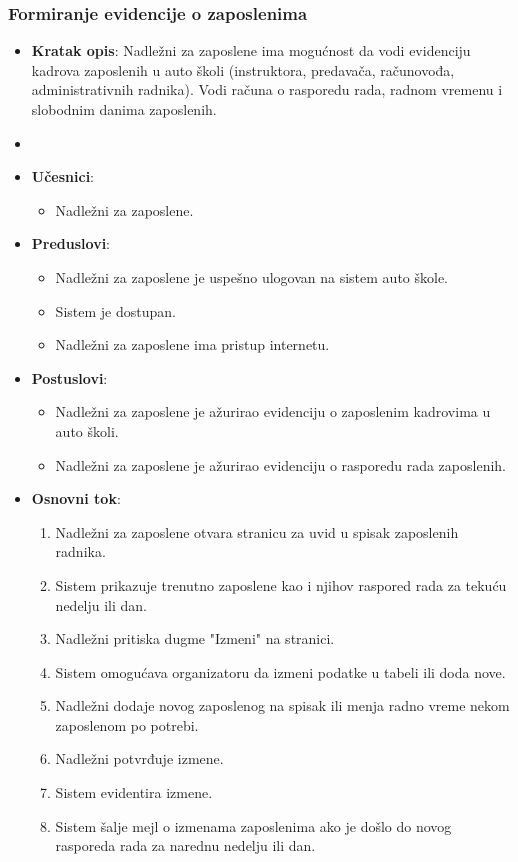 \subsubsection{Formiranje evidencije o zaposlenima}
\label{subsubsec:vozni park}
\begin{itemize}
  \item \textbf{Kratak opis}: Nadležni za zaposlene ima mogućnost da vodi evidenciju kadrova zaposlenih u auto školi 
  (instruktora, predavača, računovođa, administrativnih radnika). Vodi računa o rasporedu rada, radnom vremenu i slobodnim danima zaposlenih.

  \item 
  \item \textbf{Učesnici}:
    \begin{itemize}
    \item Nadležni za zaposlene.
    \end{itemize}
  \item \textbf{Preduslovi}:
    \begin{itemize}
    \item  Nadležni za zaposlene je uspešno ulogovan na sistem auto škole.
    \item  Sistem je dostupan.
    \item  Nadležni za zaposlene ima pristup internetu.
    \end{itemize}
  \item \textbf{Postuslovi}:
      \begin{itemize}
      \item  Nadležni za zaposlene je ažurirao evidenciju o zaposlenim kadrovima u auto školi.
      \item  Nadležni za zaposlene je ažurirao evidenciju o rasporedu rada zaposlenih.
      \end{itemize}
  \item \textbf{Osnovni tok}:
      \begin{enumerate}
        \item Nadležni za zaposlene otvara stranicu za uvid u spisak zaposlenih radnika.
        \item Sistem prikazuje trenutno zaposlene kao i njihov raspored rada za tekuću nedelju ili dan.
        \item Nadležni pritiska dugme "Izmeni" na stranici.
        \item Sistem omogućava organizatoru da izmeni podatke u tabeli ili doda nove.
        \item Nadležni dodaje novog zaposlenog na spisak ili menja radno vreme nekom zaposlenom po potrebi.
        \item Nadležni potvrđuje izmene.
        \item Sistem evidentira izmene.
        \item Sistem šalje mejl o izmenama zaposlenima ako je došlo do novog rasporeda rada za narednu nedelju ili dan.
      \end{enumerate}


\end{itemize}
